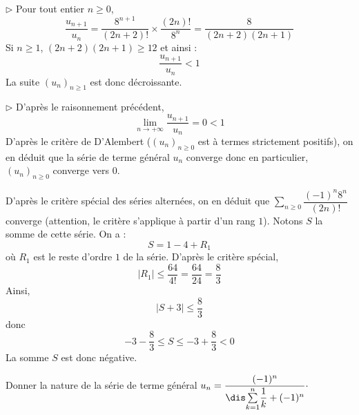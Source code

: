 \documentclass[a4paper,10pt]{report}
\newcommand{\Sum}[2]{\ensuremath{\textstyle{\sum\limits_{#1}^{#2}}}}
\begin{document}
\medskip

\noindent $\rhd$ Pour tout entier $n \geq 0$,
$$ \dfrac{u_{n+1}}{u_n} = \dfrac{8^{n+1}}{(2n+2)!} \times \dfrac{(2n)!}{8^n} =\dfrac{8}{(2n+2)(2n+1)}$$
Si $n \geq 1$, $(2n+2)(2n+1) \geq 12$ et ainsi :
$$  \dfrac{u_{n+1}}{u_n} < 1$$
La suite $(u_n)_{n \geq 1}$ est donc décroissante.

\medskip

\noindent $\rhd$ D'après le raisonnement précédent,
$$ \lim_{n \rightarrow + \infty}  \dfrac{u_{n+1}}{u_n} = 0 <1$$
D'après le critère de D'Alembert ($(u_n)_{n \geq 0}$ est à termes strictement positifs), on en déduit que la série de terme général $u_n$ converge donc en particulier, $(u_n)_{n \geq 0}$ converge vers $0$.

\medskip

\noindent D'après le critère spécial des séries alternées, on en déduit que $\Sum{n \geq 0}{} {\dfrac{( - 1)^n 8^n}{(2n)!}}$ converge (attention, le critère s'applique à partir d'un rang $1$). Notons $S$ la somme de cette série. On a :
$$ S= 1 - 4 + R_1$$
où $R_1$ est le reste d'ordre $1$ de la série. D'après le critère spécial, 
$$ \vert R_1 \vert \leq \dfrac{64}{4!} = \dfrac{64}{24} = \dfrac{8}{3}$$
Ainsi, 
$$ \vert S + 3 \vert \leq \dfrac{8}{3}$$
donc 
$$ -3- \dfrac{8}{3} \leq S \leq -3 + \dfrac{8}{3} <0$$
La somme $S$ est donc négative.

\medskip

\begin{Exercice}{} Donner la nature de la série de terme général $u_n = \dfrac{(-1)^n}{\dis \Sum{k=1}{n} \dfrac{1}{k} + (-1)^n} \cdot$
\end{Exercice}
\end{document}
